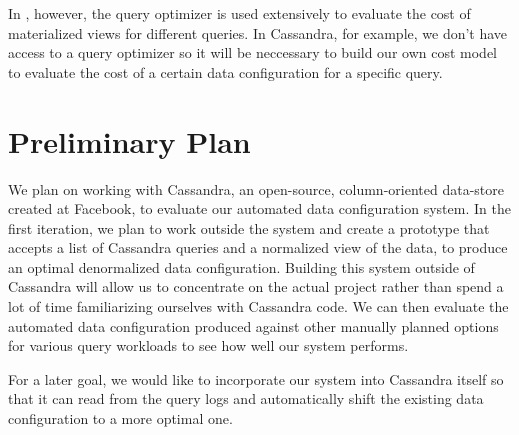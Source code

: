 \documentclass[12pt]{article}
\begin{document}
In \cite{agrawal2000automated}, however, the query optimizer is used extensively to evaluate the cost of materialized views for different queries.
In Cassandra, for example, we don't have access to a query optimizer so it will be neccessary to build our own cost model to evaluate the cost
of a certain data configuration for a specific query. 

\section{Preliminary Plan}
We plan on working with Cassandra, an open-source, column-oriented data-store created at Facebook, to evaluate our automated data configuration
system. In the first iteration, we plan to work outside the system and create a prototype that accepts a list of Cassandra queries and a normalized
view of the data, to produce an optimal denormalized data configuration. Building this system outside of Cassandra will allow us to concentrate on 
the actual project rather than spend a lot of time familiarizing ourselves with Cassandra code. We can then evaluate the automated data configuration 
produced against other manually planned options for various query workloads to see how well our system performs.

For a later goal, we would like to incorporate our system into Cassandra itself so that it can read from the query logs and automatically shift 
the existing data configuration to a more optimal one.



\end{document}
